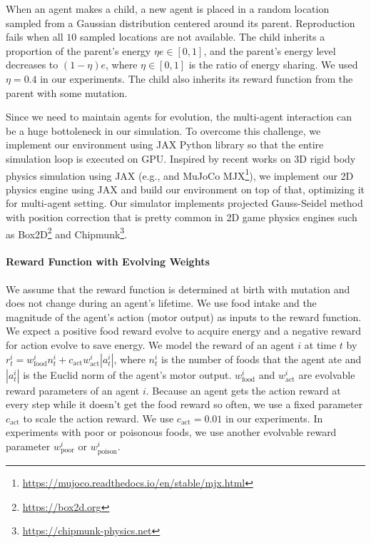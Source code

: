 When an agent makes a child, a new agent is placed in a random location sampled from a Gaussian distribution centered around its parent. Reproduction fails when all $10$ sampled locations are not available. The child inherits a proportion of the parent's energy $\eta e \in [0, 1]$, and the parent's energy level decreases to $(1-\eta)e$, where $\eta \in [0, 1]$ is the ratio of energy sharing. We used $\eta = 0.4$ in our experiments. The child also inherits its reward function from the parent with some mutation.

Since we need to maintain agents for evolution, the multi-agent interaction can be a huge bottoleneck in our simulation. To overcome this challenge, we implement our environment using JAX Python library \citep{jax2018github} so that the entire simulation loop is executed on GPU. Inspired by recent works on 3D rigid body physics simulation using JAX (e.g., \citet{brax2021github} and MuJoCo \citep{todorov2012mujoco} MJX\footnote{\url{https://mujoco.readthedocs.io/en/stable/mjx.html}}), we implement our 2D physics engine using JAX and build our
environment on top of that, optimizing it for multi-agent setting. Our simulator implements projected Gauss-Seidel method with position correction \citep{catto2005iterative} that is pretty common in 2D game physics engines such as Box2D\footnote{\url{https://box2d.org}} and Chipmunk\footnote{\url{https://chipmunk-physics.net}}.

\paragraph{Reward Function with Evolving Weights}
We assume that the reward function is determined at birth with mutation and does not change during an agent's lifetime. We use food intake and the magnitude of the agent's action (motor output) as inputs to the reward function. We expect a positive food reward evolve to acquire energy and a negative reward for action evolve to save energy.
We model the reward of an agent $i$ at time $t$ by $r^{i}_{t} = w_{\mathrm{food}}^{i}n_{t}^{i} + c_{\mathrm{act}} w_{\mathrm{act}}^{i}|a_{t}^{i}|$, where $n_{t}^{i}$ is the number of foods that the agent ate and $|a_{t}^{i}|$ is the Euclid norm of the agent's motor output. $w_{\mathrm{food}}^{i}$ and $w_{\mathrm{act}}^{i}$ are evolvable reward parameters of an agent $i$. Because an agent gets the action reward at every step while it doesn't get the food reward so often, we use a fixed parameter $c_{\mathrm{act}}$ to scale the action reward. We use $c_{\mathrm{act}} = 0.01$ in our experiments. In experiments with poor or poisonous foods, we use another evolvable reward parameter $w_{\mathrm{poor}}^{i}$ or $w_{\mathrm{poison}}^{i}$.

